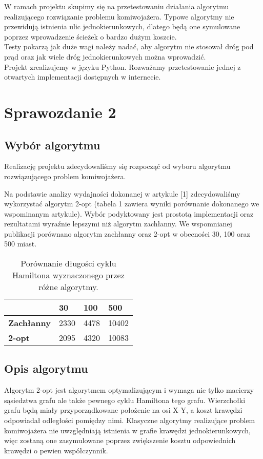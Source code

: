 \documentclass{article}
\begin{document}
W ramach projektu skupimy się na przetestowaniu działania algorytmu realizującego rozwiązanie problemu komiwojażera. Typowe algorytmy nie przewidują istnienia ulic jednokierunkowych, dlatego będą one symulowane poprzez wprowadzenie ścieżek o bardzo dużym koszcie.
\\

Testy pokarzą jak duże wagi należy nadać, aby algorytm nie stosował dróg pod prąd oraz jak wiele dróg jednokierunkowych można wprowadzić.
\\

Projekt zrealizujemy w języku Python. Rozważamy przetestowanie jednej z otwartych implementacji dostępnych w internecie.

\section{Sprawozdanie 2}

\subsection{Wybór algorytmu}
Realizację projektu zdecydowaliśmy się rozpocząć od wyboru algorytmu rozwiązującego problem komiwojażera.

Na podstawie analizy wydajności dokonanej w artykule [1] zdecydowaliśmy wykorzystać algorytm 2-opt (tabela 1 zawiera wyniki porównanie dokonanego we wspominanym artykule). Wybór podyktowany jest prostotą implementacji oraz rezultatami wyraźnie lepszymi niż algorytm zachłanny. We wspomnianej publikacji porównano algorytm zachłanny oraz 2-opt w obecności 30, 100 oraz 500 miast.  \\


\begin{table}[!h]
\centering
\caption{Porównanie długości cyklu Hamiltona wyznaczonego przez różne algorytmy.}
\label{my-label}
\begin{tabular}{|l|l|l|l|}
	\hline
						 & \textbf{30}   & \textbf{100}  & \textbf{500}   \\ \hline
	\textbf{Zachłanny}             & 2330 & 4478 & 10402 \\ \hline
	\textbf{2-opt}                 & 2095 & 4320 & 10083 \\ \hline
\end{tabular}
\end{table}

\subsection{Opis algorytmu}
Algorytm 2-opt jest algorytmem optymalizującym i wymaga nie tylko macierzy sąsiedztwa grafu ale także pewnego cyklu Hamiltona tego grafu. Wierzchołki grafu będą miały przyporządkowane położenie na osi X-Y, a koszt krawędzi odpowiadał odległości pomiędzy nimi. Klasyczne algorytmy realizujące problem komiwojażera nie uwzględniają istnienia w grafie krawędzi jednokierunkowych, więc zostaną one zasymulowane poprzez zwiększenie kosztu odpowiednich krawędzi o pewien współczynnik. \\
\end{document}
